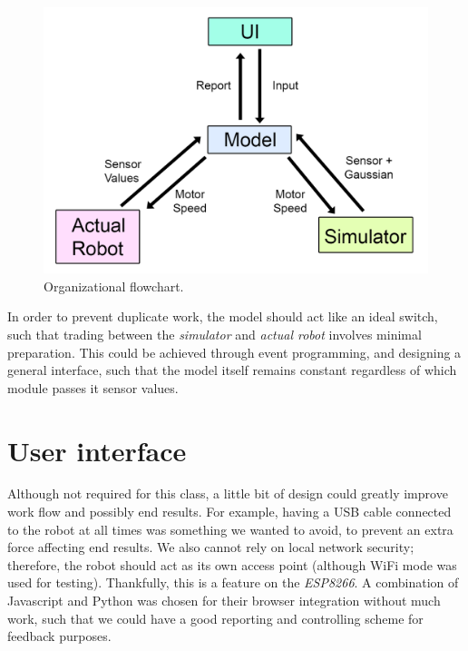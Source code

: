 \documentclass[11pt]{article}
\begin{document}
\begin{figure}[H]
	\includegraphics[width=\linewidth]{fig1.png}
	\caption{Organizational flowchart.}
	\label{fig:flow}
\end{figure}

In order to prevent duplicate work, the model should act like an ideal switch, such that trading between the \emph{simulator} and \emph{actual robot} involves minimal preparation. This could be achieved through event programming, and designing a general interface, such that the model itself remains constant regardless of which module passes it sensor values.

\section{User interface}

Although not required for this class, a little bit of design could greatly improve work flow and possibly end results. For example, having a USB cable connected to the robot at all times was something we wanted to avoid, to prevent an extra force affecting end results. We also cannot rely on local network security; therefore, the robot should act as its own access point (although WiFi mode was used for testing). Thankfully, this is a feature on the \emph{ESP8266}. A combination of Javascript and Python was chosen for their browser integration without much work, such that we could have a good reporting and controlling scheme for feedback purposes.
\end{document}
